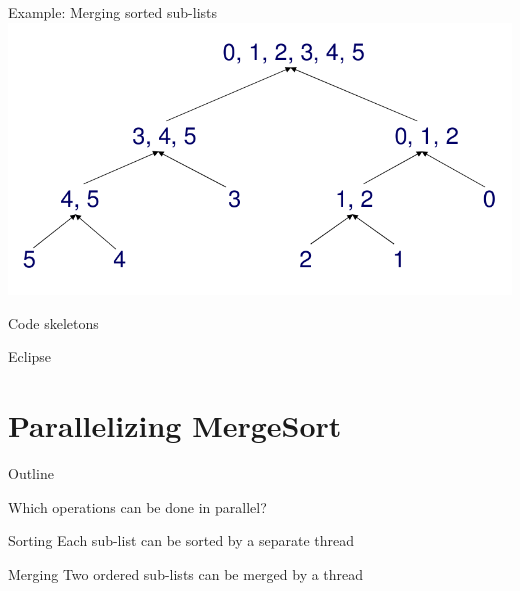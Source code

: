 \begin{frame}{Example: Merging sorted sub-lists}
  \includegraphics[width=\textwidth]{figures/mergesort-merge}  
\end{frame}

\begin{frame}{Code skeletons}
  \begin{center}
    {\huge Eclipse}
  \end{center}
\end{frame}


\section{Parallelizing MergeSort}

\begin{frame}{Outline}
  \tableofcontents[current]
\end{frame}

\begin{frame}{Which operations can be done in parallel?}
  
  \pause

  \begin{block}{Sorting}
    Each sub-list can be sorted by a separate thread
  \end{block}


  \pause

  \begin{block}{Merging}
    Two ordered sub-lists can be merged by a thread
  \end{block}
\end{frame}

